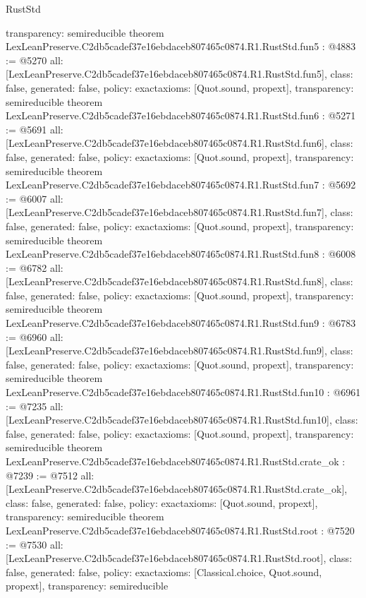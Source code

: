 \begin{lexlean}{RustStd}
\begin{coremodule}
{  transparency: semireducible
}
theorem LexLeanPreserve.C2db5cadef37e16ebdaceb807465c0874.R1.RustStd.fun5 : @4883 := @5270 {
  all: [LexLeanPreserve.C2db5cadef37e16ebdaceb807465c0874.R1.RustStd.fun5],
  class: false,
  generated: false,
  policy: exact{axioms: [Quot.sound, propext]},
  transparency: semireducible
}
theorem LexLeanPreserve.C2db5cadef37e16ebdaceb807465c0874.R1.RustStd.fun6 : @5271 := @5691 {
  all: [LexLeanPreserve.C2db5cadef37e16ebdaceb807465c0874.R1.RustStd.fun6],
  class: false,
  generated: false,
  policy: exact{axioms: [Quot.sound, propext]},
  transparency: semireducible
}
theorem LexLeanPreserve.C2db5cadef37e16ebdaceb807465c0874.R1.RustStd.fun7 : @5692 := @6007 {
  all: [LexLeanPreserve.C2db5cadef37e16ebdaceb807465c0874.R1.RustStd.fun7],
  class: false,
  generated: false,
  policy: exact{axioms: [Quot.sound, propext]},
  transparency: semireducible
}
theorem LexLeanPreserve.C2db5cadef37e16ebdaceb807465c0874.R1.RustStd.fun8 : @6008 := @6782 {
  all: [LexLeanPreserve.C2db5cadef37e16ebdaceb807465c0874.R1.RustStd.fun8],
  class: false,
  generated: false,
  policy: exact{axioms: [Quot.sound, propext]},
  transparency: semireducible
}
theorem LexLeanPreserve.C2db5cadef37e16ebdaceb807465c0874.R1.RustStd.fun9 : @6783 := @6960 {
  all: [LexLeanPreserve.C2db5cadef37e16ebdaceb807465c0874.R1.RustStd.fun9],
  class: false,
  generated: false,
  policy: exact{axioms: [Quot.sound, propext]},
  transparency: semireducible
}
theorem LexLeanPreserve.C2db5cadef37e16ebdaceb807465c0874.R1.RustStd.fun10 : @6961 := @7235 {
  all: [LexLeanPreserve.C2db5cadef37e16ebdaceb807465c0874.R1.RustStd.fun10],
  class: false,
  generated: false,
  policy: exact{axioms: [Quot.sound, propext]},
  transparency: semireducible
}
theorem LexLeanPreserve.C2db5cadef37e16ebdaceb807465c0874.R1.RustStd.crate_ok : @7239 := @7512 {
  all: [LexLeanPreserve.C2db5cadef37e16ebdaceb807465c0874.R1.RustStd.crate_ok],
  class: false,
  generated: false,
  policy: exact{axioms: [Quot.sound, propext]},
  transparency: semireducible
}
theorem LexLeanPreserve.C2db5cadef37e16ebdaceb807465c0874.R1.RustStd.root : @7520 := @7530 {
  all: [LexLeanPreserve.C2db5cadef37e16ebdaceb807465c0874.R1.RustStd.root],
  class: false,
  generated: false,
  policy: exact{axioms: [Classical.choice, Quot.sound, propext]},
  transparency: semireducible
}


\end{coremodule}
\end{lexlean}
